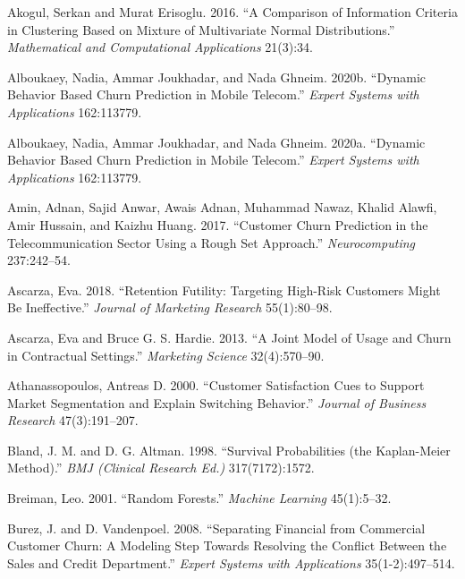 \documentclass[
  12pt,
]{article}
\newlength{\cslhangindent}
\newlength{\cslentryspacingunit} %
\newenvironment{CSLReferences}[2] %
 {%
  \setlength{\parindent}{0pt}
  \ifodd #1
  \let\oldpar\par
  \def\par{\hangindent=\cslhangindent\oldpar}
  \fi
  \setlength{\parskip}{#2\cslentryspacingunit}
 }%
 {}
\begin{document}
\hypertarget{refs}{}
\begin{CSLReferences}{1}{0}
\leavevmode{}%
Akogul, Serkan and Murat Erisoglu. 2016. {``A Comparison of Information Criteria in Clustering Based on Mixture of Multivariate Normal Distributions.''} \emph{Mathematical and Computational Applications} 21(3):34.

\leavevmode{}%
Alboukaey, Nadia, Ammar Joukhadar, and Nada Ghneim. 2020b. {``Dynamic Behavior Based Churn Prediction in Mobile Telecom.''} \emph{Expert Systems with Applications} 162:113779.

\leavevmode{}%
Alboukaey, Nadia, Ammar Joukhadar, and Nada Ghneim. 2020a. {``Dynamic Behavior Based Churn Prediction in Mobile Telecom.''} \emph{Expert Systems with Applications} 162:113779.

\leavevmode{}%
Amin, Adnan, Sajid Anwar, Awais Adnan, Muhammad Nawaz, Khalid Alawfi, Amir Hussain, and Kaizhu Huang. 2017. {``Customer Churn Prediction in the Telecommunication Sector Using a Rough Set Approach.''} \emph{Neurocomputing} 237:242--54.

\leavevmode{}%
Ascarza, Eva. 2018. {``Retention Futility: Targeting High-Risk Customers Might Be Ineffective.''} \emph{Journal of Marketing Research} 55(1):80--98.

\leavevmode{}%
Ascarza, Eva and Bruce G. S. Hardie. 2013. {``A Joint Model of Usage and Churn in Contractual Settings.''} \emph{Marketing Science} 32(4):570--90.

\leavevmode{}%
Athanassopoulos, Antreas D. 2000. {``Customer Satisfaction Cues to Support Market Segmentation and Explain Switching Behavior.''} \emph{Journal of Business Research} 47(3):191--207.

\leavevmode{}%
Bland, J. M. and D. G. Altman. 1998. {``Survival Probabilities (the Kaplan-Meier Method).''} \emph{BMJ (Clinical Research Ed.)} 317(7172):1572.

\leavevmode{}%
Breiman, Leo. 2001. {``Random Forests.''} \emph{Machine Learning} 45(1):5--32.

\leavevmode{}%
Burez, J. and D. Vandenpoel. 2008. {``Separating Financial from Commercial Customer Churn: {A} Modeling Step Towards Resolving the Conflict Between the Sales and Credit Department.''} \emph{Expert Systems with Applications} 35(1-2):497--514.


\end{CSLReferences}
\end{document}

